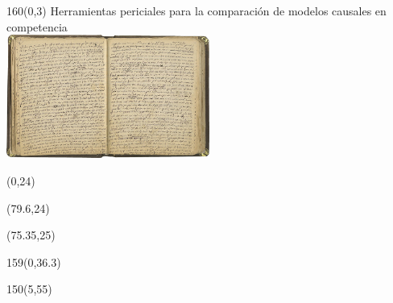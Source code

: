 \documentclass[shownotes,aspectratio=169]{beamer}
\begin{document}
\begin{frame}[plain]

\begin{textblock}{160}(0,3) \centering
Herramientas periciales para la comparación de modelos causales en competencia \\[0.1cm]

\includegraphics[width=0.5\textwidth]{../../text.jpg}
\end{textblock}


\begin{textblock}{79.6}(0,24)
\hfill {}
\end{textblock}
\begin{textblock}{80}(79.6,24)
\end{textblock}
\begin{textblock}{60}(75.35,25)
\end{textblock}
\begin{textblock}{159}(0,36.3) \centering
\LARGE  \textcolor{black!85}{}
\end{textblock}


\begin{textblock}{150}(5,55)
\begin{figure}[ht!]
  \centering
\end{figure}
\end{textblock}
\end{frame}
\end{document}

